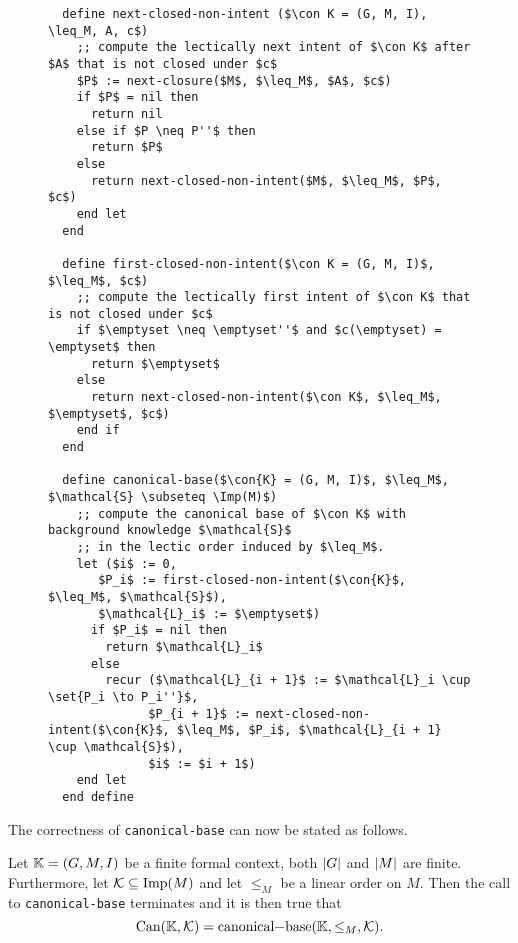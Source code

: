\begin{figure}[tp]
  \begin{Algorithm}
    \label{alg:canonical-base}
    \hspace*{0cm}
\begin{lstlisting}
  define next-closed-non-intent ($\con K = (G, M, I), \leq_M, A, c$)
    ;; compute the lectically next intent of $\con K$ after $A$ that is not closed under $c$
    $P$ := next-closure($M$, $\leq_M$, $A$, $c$)
    if $P$ = nil then
      return nil
    else if $P \neq P''$ then
      return $P$
    else
      return next-closed-non-intent($M$, $\leq_M$, $P$, $c$)
    end let
  end

  define first-closed-non-intent($\con K = (G, M, I)$, $\leq_M$, $c$)
    ;; compute the lectically first intent of $\con K$ that is not closed under $c$
    if $\emptyset \neq \emptyset''$ and $c(\emptyset) = \emptyset$ then
      return $\emptyset$
    else
      return next-closed-non-intent($\con K$, $\leq_M$, $\emptyset$, $c$)
    end if
  end

  define canonical-base($\con{K} = (G, M, I)$, $\leq_M$, $\mathcal{S} \subseteq \Imp(M)$)
    ;; compute the canonical base of $\con K$ with background knowledge $\mathcal{S}$
    ;; in the lectic order induced by $\leq_M$.
    let ($i$ := 0,
       $P_i$ := first-closed-non-intent($\con{K}$, $\leq_M$, $\mathcal{S}$),
       $\mathcal{L}_i$ := $\emptyset$)
      if $P_i$ = nil then
        return $\mathcal{L}_i$
      else
        recur ($\mathcal{L}_{i + 1}$ := $\mathcal{L}_i \cup \set{P_i \to P_i''}$,
              $P_{i + 1}$ := next-closed-non-intent($\con{K}$, $\leq_M$, $P_i$, $\mathcal{L}_{i + 1} \cup \mathcal{S}$),
              $i$ := $i + 1$)
    end let
  end define
\end{lstlisting}
  \end{Algorithm}
\end{figure}

The correctness of \lstinline{canonical-base} can now be stated as follows.

\begin{Theorem}
  \label{thm:canonical-base-computation}
  Let ${\mathbb{K}} = (G, M, I)$ be a finite formal context, \ie both $\lvert G\rvert$ and $\lvert M\rvert$ are
  finite.  Furthermore, let $\mathcal{K} \subseteq \operatorname{Imp}(M)$ and let $\leq_M$ be a linear
  order on $M$.  Then the call to \lstinline{canonical-base} terminates and it is then
  true that
  \begin{equation*}
    \Can(\con K, \mathcal{K}) = \text{\lstinline{canonical-base}}(\con K, \leq_M, \mathcal{K}).
  \end{equation*}
\end{Theorem}

